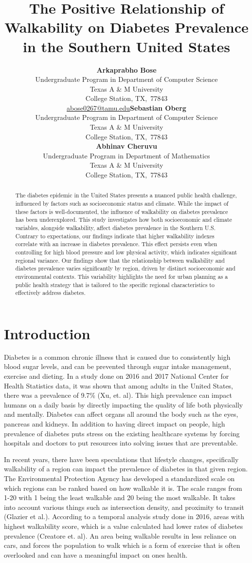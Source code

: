 \documentclass[
]{article}
\title{The Positive Relationship of Walkability on Diabetes Prevalence
in the Southern United States}
\author{\textbf{Arkaprabho Bose}\\Undergraduate Program in Department of
Computer Science\\Texas A \& M University\\College Station,
TX,\ 77843\\\href{mailto:abose0267@tamu.edu}{abose0267@tamu.edu}\asep\textbf{Sebastian
Oberg}\\Undergraduate Program in Department of Computer Science\\Texas A
\& M University\\College Station, TX,\ 77843\\\asep\textbf{Abhinav
Cheruvu}\\Undergraduate Program in Department of Mathematics\\Texas A \&
M University\\College Station, TX,\ 77843\\}
\date{}
\begin{document}
\maketitle
\begin{abstract}
The diabetes epidemic in the United States presents a nuanced public
health challenge, influenced by factors such as socioeconomic status and
climate. While the impact of these factors is well-documented, the
influence of walkability on diabetes prevalence has been underexplored.
This study investigates how both socioeconomic and climate variables,
alongside walkability, affect diabetes prevalence in the Southern U.S.
Contrary to expectations, our findings indicate that higher walkability
indexes correlate with an increase in diabetes prevalence. This effect
persists even when controlling for high blood pressure and low physical
activity, which indicates significant regional variance. Our findings
show that the relationship between walkability and diabetes prevalence
varies significantly by region, driven by distinct socioeconomic and
environmental contexts. This variability highlights the need for urban
planning as a public health strategy that is tailored to the specific
regional characteristics to effectively address diabetes.
\end{abstract}

\section{Introduction}\label{sec-intro}

Diabetes is a common chronic illness that is caused due to consistently
high blood sugar levels, and can be prevented through sugar intake
management, exercise and dieting. In a study done on 2016 and 2017
National Center for Health Statistics data, it was shown that among
adults in the United States, there was a prevalence of 9.7\% (Xu, et.
al). This high prevalence can impact humans on a daily basis by directly
impacting the quality of life both physically and mentally. Diabetes can
affect organs all around the body such as the eyes, pancreas and
kidneys. In addition to having direct impact on people, high prevalence
of diabetes puts stress on the existing healthcare systems by forcing
hospitals and doctors to put resources into solving issues that are
preventable.

In recent years, there have been speculations that lifestyle changes,
specifically walkability of a region can impact the prevalence of
diabetes in that given region. The Environmental Protection Agency has
developed a standardized scale on which regions can be ranked based on
how walkable it is. The scale ranges from 1-20 with 1 being the least
walkable and 20 being the most walkable. It takes into account various
things such as intersection density, and proximity to transit (Glazier
et al.). According to a temporal analysis study done in 2016, areas with
highest walkability score, which is a value calculated had lower rates
of diabetes prevalence (Creatore et. al). An area being walkable results
in less reliance on cars, and forces the population to walk which is a
form of exercise that is often overlooked and can have a meaningful
impact on ones health.
\end{document}
